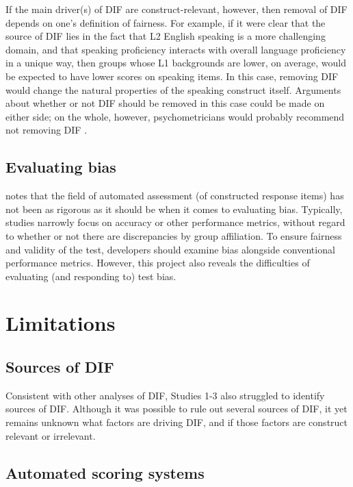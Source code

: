 \documentclass [PhD] {uclathes}
\begin{document}
If the main driver(s) of DIF are construct-relevant, however, then removal of DIF depends on one’s definition of fairness. For example, if it were clear that the source of DIF lies in the fact that L2 English speaking is a more challenging domain, and that speaking proficiency interacts with overall language proficiency in a unique way, then groups whose L1 backgrounds are lower, on average, would be expected to have lower scores on speaking items. In this case, removing DIF would change the natural properties of the speaking construct itself. Arguments about whether or not DIF should be removed in this case could be made on either side; on the whole, however, psychometricians would probably recommend not removing DIF \citep{aera2014}. 

\subsection{Evaluating bias}

\citet{ormerod2022automated} notes that the field of automated assessment (of constructed response items) has not been as rigorous as it should be when it comes to evaluating bias. Typically, studies narrowly focus on accuracy or other performance metrics, without regard to whether or not there are discrepancies by group affiliation. To ensure fairness and validity of the test, developers should examine bias alongside conventional performance metrics. However, this project also reveals the difficulties of evaluating (and responding to) test bias. 

\section{Limitations}

\subsection{Sources of DIF}

Consistent with other analyses of DIF, Studies 1-3 also struggled to identify sources of DIF. Although it was possible to rule out several sources of DIF, it yet remains unknown what factors are driving DIF, and if those factors are construct relevant or irrelevant. 

\subsection{Automated scoring systems}
\end{document}

